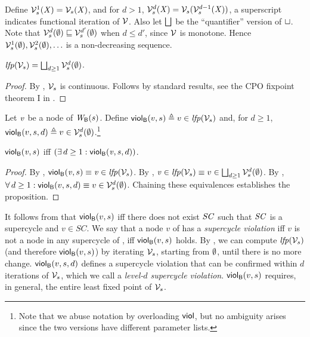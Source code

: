 Define $\VFsi{s}{\XS}{1} = \VFs{s}{\XS}$, and for $d > 1$, $\VFsi{s}{\XS}{d} =  \VFs{s}{ \VFsi{s}{\XS}{d-1} }$, 
\ie a superscript indicates functional iteration of $\VFsymb$. Also let $\JOIN$ be the ``quantifier'' version of $\join$.
Note that $\VFsi{s}{\ewfg}{d} \subg \VFsi{s}{\ewfg}{d'}$ when $d \le d'$, since $\VFsymb$
is monotone.
Hence $\VFsi{s}{\ewfg}{1}, \VFsi{s}{\ewfg}{2}, \ldots$ is a non-decreasing sequence.

\begin{proposition}  \label{prop:computeLFP}
$\lfp{\VFsymb_s} = \JOIN_{d \ge 1} \VFsi{s}{\ewfg}{d}$.
\end{proposition}
%
\begin{proof}
By , $\VFsymb_s$ is continuous. Follows by standard results, \eg see the CPO fixpoint theorem I in 
.
\end{proof}



\begin{definition}
\label{def:supercycle-violation}
\label{def:supercycle.violation}
\label{defn:supercycle.violation}
Let $\ndv$ be a node of $\wfg{\B}{s}$. Define
$\scV{v}{s} \df v \in \lfp{\VFsymb_s}$ and, for $d \ge 1$,
$\scVd{v}{d}{s} \df v \in \VFsi{s}{\ewfg}{d}$.\footnote{Note that
we abuse notation by overloading $\SMATHID{viol}$, but no ambiguity arises since the two versions have
different parameter lists.}
\end{definition}

\begin{proposition}
\label{prop:globViol-equiv-globViolDist}
$\scV{\ndv}{s}$ iff  $(\ex d \ge 1: \scVd{\ndv}{d}{s})$.
\end{proposition}
%
\begin{proof}
By , $\scV{\ndv}{s} \ev \ndv \in \lfp{\VFsymb_s}$.
By , $\ndv \in \lfp{\VFsymb_s} \ev v \in \JOIN_{d \ge 1} \VFsi{s}{\ewfg}{d}$.
By , $\fa d \ge 1: \scVd{v}{d}{s} \ev v \in \VFsi{s}{\ewfg}{d}$.
Chaining these equivalences establishes the proposition.
\end{proof}
%
It follows from  that $\scV{v}{s}$ iff there does not exist $\SC$ such that $\SC$ is a supercycle and $v \in SC$.
We say that a node $v$ of  has a \emph{supercycle violation} %
iff $v$ is not a node in any supercycle of , 
\ie iff $\scV{v}{s}$ holds. 
By , we can compute $\lfp{\VFsymb_s}$ (and therefore $\scV{v}{s}$) by iterating $\VFsymb_s$, starting from $\ewfg$, until there is no more change.
$\scVd{v}{d}{s}$ defines a supercycle violation that can be confirmed within $d$ iterations of $\VFsymb_s$, which we call a \emph{level-$d$ supercycle violation}.
$\scV{v}{s}$ requires, in general, the entire least fixed point of $\VFsymb_s$.


